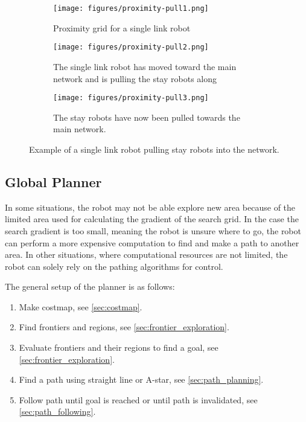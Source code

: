 \begin{figure}[h]
    \begin{center}
        \begin{subfigure}[b]{0.31\textwidth}
            \centering
            \texttt{[image: figures/proximity-pull1.png]}
            \caption{Proximity grid for a {\color{red} single link} robot}
            \label{fig:proximity-pull1}
        \end{subfigure}
        \begin{subfigure}[b]{0.31\textwidth}
            \centering
            \texttt{[image: figures/proximity-pull2.png]}
            \caption{The single link robot has moved toward the main network and is pulling the stay robots along}
            \label{fig:proximity-pull2}
        \end{subfigure}
        \begin{subfigure}[b]{0.31\textwidth}
            \centering
            \texttt{[image: figures/proximity-pull3.png]}
            \caption{The stay robots have now been pulled towards the main network.}
            \label{fig:proximity-pull3}
        \end{subfigure}
    \end{center}
    \caption{Example of a {\color{red} single link} robot pulling stay robots into the network.}\label{fig:proximity-pull}
\end{figure}




\subsection{Global Planner}
In some situations, the robot may not be able explore new area because of the limited area used for calculating the gradient of the search grid.
In the case the search gradient is too small, meaning the robot is unsure where to go, the robot can perform a more expensive computation to find and make a path to another area.
In other situations, where computational resources are not limited, the robot can solely rely on the pathing algorithms for control.

The general setup of the planner is as follows:
\begin{enumerate}
  \item Make costmap, see \cref{sec:costmap}.
  \item Find frontiers and regions, see \cref{sec:frontier_exploration}.
  \item Evaluate frontiers and their regions to find a goal, see \cref{sec:frontier_exploration}.
  \item Find a path using straight line or A-star, see \cref{sec:path_planning}.
  \item Follow path until goal is reached or until path is invalidated, see \cref{sec:path_following}.
\end{enumerate}

